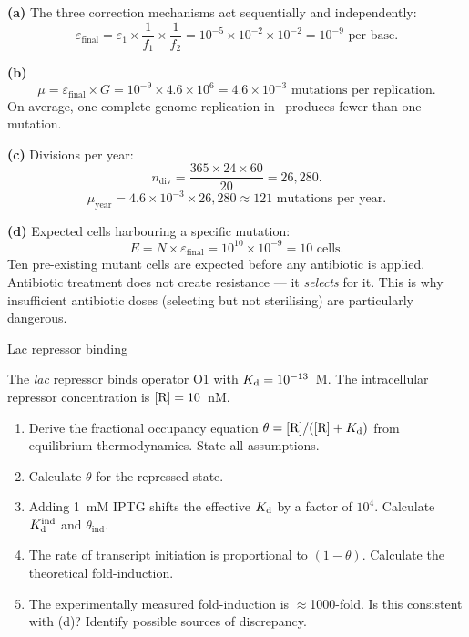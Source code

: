 \documentclass[12pt, a4paper, oneside]{report}
\begin{document}
\begin{solution}
  \textbf{(a)} The three correction mechanisms act sequentially and
  independently:
  \[
    \varepsilon_\text{final}
    = \varepsilon_1 \times \frac{1}{f_1} \times \frac{1}{f_2}
    = 10^{-5} \times 10^{-2} \times 10^{-2}
    = \boxed{10^{-9} \text{ per base.}}
  \]

  \textbf{(b)}
  \[
    \mu = \varepsilon_\text{final} \times G
        = 10^{-9} \times 4.6 \times 10^6
        = 4.6 \times 10^{-3} \text{ mutations per replication.}
  \]
  On average, one complete genome replication in \Ecoli\ produces fewer
  than one mutation.

  \textbf{(c)} Divisions per year:
  \[
    n_\text{div} = \frac{365 \times 24 \times 60}{20} = 26{,}280.
  \]
  \[
    \mu_\text{year} = 4.6 \times 10^{-3} \times 26{,}280 \approx 121
    \text{ mutations per year.}
  \]

  \textbf{(d)} Expected cells harbouring a specific mutation:
  \[
    E = N \times \varepsilon_\text{final}
      = 10^{10} \times 10^{-9} = 10 \text{ cells.}
  \]
  Ten pre-existing mutant cells are expected before any antibiotic is
  applied. Antibiotic treatment does not create resistance — it \emph{selects}
  for it. This is why insufficient antibiotic doses (selecting but not
  sterilising) are particularly dangerous.
\end{solution}

\begin{problem}{\enspace{}\enspace{}\enspace Lac repressor binding}

  The \textit{lac} repressor binds operator O1 with
  $K_{\mathrm{d}} = 10^{-13}$~M. The intracellular repressor concentration
  is $[\mathrm{R}] = 10$~nM.

  \begin{enumerate}
    \item Derive the fractional occupancy equation
          $\theta = [\mathrm{R}]/([\mathrm{R}] + K_{\mathrm{d}})$ from equilibrium
          thermodynamics. State all assumptions.
    \item Calculate $\theta$ for the repressed state.
    \item Adding 1~mM IPTG shifts the effective $K_{\mathrm{d}}$ by a factor of $10^4$.
          Calculate $K_{\mathrm{d}}^\text{ind}$ and $\theta_\text{ind}$.
    \item The rate of transcript initiation is proportional to
          $(1-\theta)$. Calculate the theoretical fold-induction.
    \item The experimentally measured fold-induction is $\approx$1000-fold.
          Is this consistent with (d)? Identify possible sources of
          discrepancy.
  \end{enumerate}
\end{problem}
\end{document}
